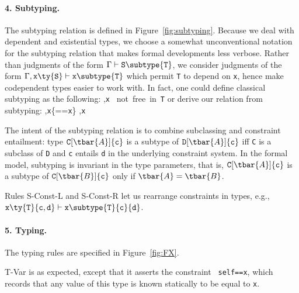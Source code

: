 \paragraph{4. Subtyping.} The subtyping relation is defined in Figure~\ref{fig:subtyping}.
Because we deal with dependent and existential types, we choose a somewhat unconventional notation for the subtyping relation that makes formal developments less verbose. Rather than judgments of the form $\Gamma\vdash{\tt S}\subtype{\tt T}$, we consider judgments of the form $\Gamma,{\tt x}\ty{\tt S}\vdash{\tt x}\subtype{\tt T}$ which permit {\tt T} to depend on {\tt x}, hence make codependent types easier to work with. In fact, one could define classical subtyping as the following:
\infrule
	{ \andalso \Gamma,{\tt x} ~\rm not~free~in~{\tt T}}
	{\Gamma{}}
or derive our relation from subtyping:
\infrule
	{\Gamma,{\tt x}\{\self=={\tt x}\}}
	{\Gamma,{\tt x}}

The intent of the subtyping relation is to combine subclassing and constraint entailment: type ${\tt C}[\tbar{A}]\{{\tt c}\}$ is a subtype of ${\tt D}[\tbar{A}]\{{\tt c}\}$ iff {\tt C} is a subclass of {\tt D} and {\tt c} entails {\tt d} in the underlying constraint system. In the formal model, subtyping is invariant in the type parameters, that is, ${\tt C}[\tbar{A}]\{{\tt c}\}$ is a subtype of ${\tt C}[\tbar{B}]\{{\tt c}\}$ only if $\tbar{A}=\tbar{B}$.

Rules {\sc S-Const-L} and {\sc S-Const-R} let us rearrange constraints in types, e.g., ${\tt x}\ty{\tt T}\{{\tt c},{\tt d}\}\vdash {\tt x}\subtype {\tt T}\{{\tt c}\}\{{\tt d}\}$.


\paragraph{5. Typing.} The typing rules are specified in Figure~\ref{fig:FX}.

{\sc T-Var} is as expected, except that it asserts the constraint {\tt
self==x}, which records that any value of this type is known
statically to be equal to {\tt x}. %


